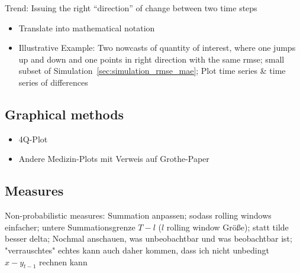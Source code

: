\documentclass[oneside]{article}
\theoremstyle{plain}%
\theoremstyle{definition}
\newcommand{\ydiff}{\tilde{y}}
\newcommand{\xdiff}{\tilde{x}}
\begin{document}
Trend: Issuing the right \enquote{direction} of change between two time steps

\begin{itemize}
  \item Translate into mathematical notation
  \item Illustrative Example: Two nowcasts of quantity of interest, where one jumps up and down and one points in right direction with the same rmse; small subset of Simulation~\ref{sec:simulation_rmse_mae}; Plot time series \& time series of differences
\end{itemize}

\subsection{Graphical methods}

\begin{itemize}
  \item 4Q-Plot
  \item Andere Medizin-Plots mit Verweis auf Grothe-Paper
\end{itemize}


\subsection{Measures}


Non-probabilistic measures: Summation anpassen; sodass rolling windows einfacher; untere Summationsgrenze $T - l$ ($l$ rolling window Größe); statt tilde besser delta; Nochmal anschauen, was unbeobachtbar und was beobachtbar ist; "verrauschtes" echtes kann auch daher kommen, dass ich nicht unbedingt $x - y_{t-1}$ rechnen kann
\end{document}
